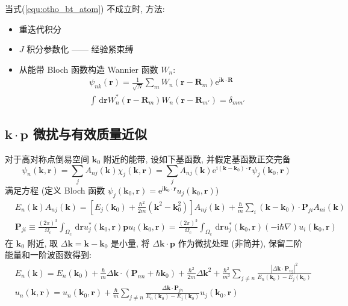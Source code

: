 \documentclass[11pt,a4paper]{article}%
\numberwithin{equation}{section}%
\renewcommand*{\vec}[1]{\bm{#1}}%
\newcommand{\dif}{\,\mathrm d}
\newcommand\mi{\mathrm{i}}
\newcommand\e{\mathrm{e}}%
\begin{document}
当式(\ref{equ:otho_bt_atom}) 不成立时, 方法:
\begin{itemize}
	\item 重迭代积分
	\item $J$ 积分参数化 ------ 经验紧束缚
	\item 从能带 Bloch 函数构造 Wannier 函数 $W_n$: 
	\begin{align}
		&\psi_{nk}(\vec r) = \frac 1{\sqrt N}\sum_m W_n(\vec r - \vec R_m)\e^{\mi\vec k\cdot\vec R} \\
		&\int\dif\vec r W_n^*(\vec r - \vec R_m)W_n(\vec r - \vec R_{m'}) = \delta_{mm'}
	\end{align}
\end{itemize}
\subsection[kp 微扰与有效质量近似]{$\vec k\cdot\vec p$ 微扰与有效质量近似} %
\label{sub:kp_and_eff_mass}
对于高对称点倒易空间 $\vec k_0$ 附近的能带, 设如下基函数, 并假定基函数正交完备
\begin{equation}
	\psi_{n}(\vec k, \vec r) = \sum_j A_{nj}(\vec k)\chi_j(\vec k,\vec r) = \sum_j A_{nj}(\vec k)\e^{\mi(\vec k - \vec k_0)\cdot\vec r}\psi_j(\vec k_0, \vec r)
\end{equation}
满足方程 (定义%
Bloch 函数 $\psi_j(\vec k_0, \vec r) = \e^{\mi\vec k_0\cdot\vec r}u_j(\vec k_0,\vec r)$)
\begin{align}
	&E_n(\vec k)A_{nj}(\vec k) = \left[E_j(\vec k_0) + \frac{\hbar^2}{2m}\left(\vec k^2 - \vec k_0^2\right)\right]A_{nj}(\vec k) + \frac\hbar m\sum_i \left(\vec k - \vec k_0\right)\cdot\vec P_{ji}A_{ni}(\vec k) \\
	&\vec P_{ji}\equiv\frac{(2\pi)^3}{\Omega_c}\int_{\Omega_c}\dif\vec r u_j^*(\vec k_0,\vec r)\vec p u_i(\vec k_0,\vec r) = \frac{(2\pi)^3}{\Omega_c}\int_{\Omega_c}\dif\vec r u_j^*(\vec k_0,\vec r)(-\mi\hbar\nabla) u_i(\vec k_0,\vec r)
\end{align}
在 $\vec k_0$ 附近, 取 $\Delta \vec k = \vec k - \vec k_0$ 是小量, 将 $\Delta\vec k\cdot\vec p$ 作为微扰处理 (非简并), 保留二阶能量和一阶波函数得到: 
\begin{align}
	&E_n(\vec k) = E_n(\vec k_0) + \frac{\hbar}{m}\Delta\vec k\cdot(\vec P_{nn} + \hbar\vec k_0) + \frac{\hbar^2}{2m}\Delta \vec k^2 + \frac{\hbar^2}{m^2}\sum_{j\neq n}\frac{\left|\Delta\vec k\cdot\vec P_{nj}\right|^2}{E_n(\vec k_0) - E_j(\vec k_0)} \\
	&u_n(\vec k,\vec r) = u_n(\vec k_0,\vec r) + \frac{\hbar}{m}\sum_{j\neq n} \frac{\Delta\vec k\cdot\vec P_{jn}}{E_n(\vec k_0) - E_j(\vec k_0)}u_j(\vec k_0,\vec r)
\end{align}
\end{document}
